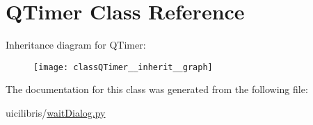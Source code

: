 \hypertarget{classQTimer}{\section{\-Q\-Timer \-Class \-Reference}
\label{classQTimer}
}


\-Inheritance diagram for \-Q\-Timer\-:
\nopagebreak
\begin{figure}[H]
\begin{center}
\leavevmode
\texttt{[image: classQTimer\_\_inherit\_\_graph]}
\end{center}
\end{figure}


\-The documentation for this class was generated from the following file\-:\begin{DoxyCompactItemize}
\item 
uicilibris/\hyperlink{waitDialog_8py}{wait\-Dialog.\-py}\end{DoxyCompactItemize}
